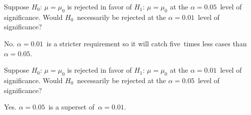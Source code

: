 \begin{problem}
\end{problem}

\begin{subproblem}
  Suppose $H_0$: ${\mu = \mu_0}$ is rejected in favor of $H_1$: ${\mu = \mu_0}$ at the ${\alpha = 0.05}$~level of significance.  Would $H_0$~necessarily be rejected at the ${\alpha = 0.01}$~level of significance?
\end{subproblem}

\noindent
No.  ${\alpha = 0.01}$~is a stricter requirement so it will catch five~times less cases than ${\alpha = 0.05}$.

\begin{subproblem}
  Suppose $H_0$: ${\mu = \mu_0}$ is rejected in favor of $H_1$: ${\mu = \mu_0}$ at the ${\alpha = 0.01}$~level of significance.  Would $H_0$~necessarily be rejected at the ${\alpha = 0.05}$~level of significance?
\end{subproblem}

Yes.  ${\alpha = 0.05}$~is a superset of~${\alpha = 0.01}$.
